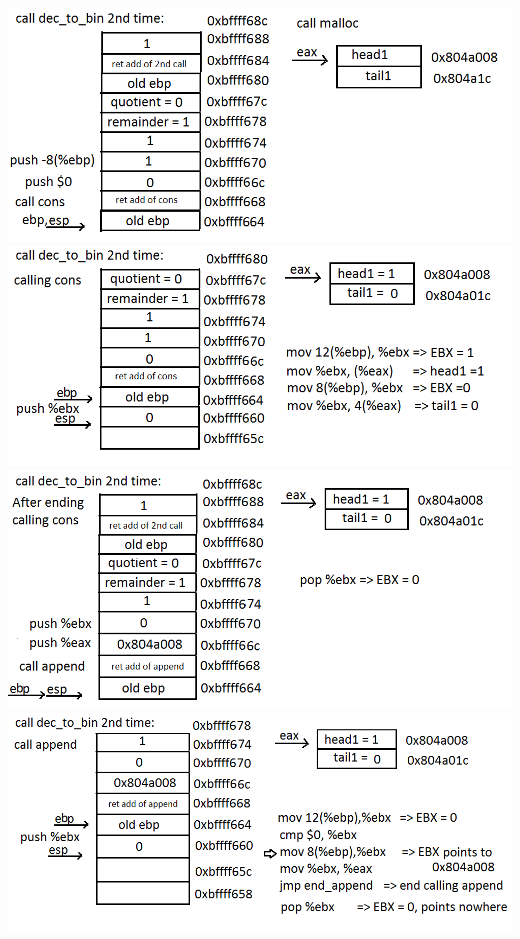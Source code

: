 \documentclass{article}
\begin{document}
\begin{center}
\includegraphics[scale=0.5]{stack7.png} \\
\includegraphics[scale=0.5]{stack8.png} \\
\includegraphics[scale=0.5]{stack9.png} \\
\includegraphics[scale=0.5]{stack10.png}\\

\end{center}
\end{document}
